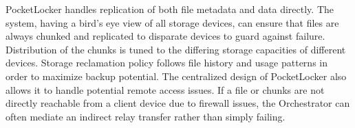PocketLocker handles replication of both file metadata and data directly.  The
system, having a bird's eye view of all storage devices, can ensure that files
are always chunked and replicated to disparate devices to guard against
failure.  Distribution of the chunks is tuned to the differing storage
capacities of different devices.  Storage reclamation policy follows file
history and usage patterns in order to maximize backup potential.  The
centralized design of PocketLocker also allows it to handle potential remote
access issues.  If a file or chunks are not directly reachable from a client
device due to firewall issues, the Orchestrator can often mediate an indirect
relay transfer rather than simply failing.


